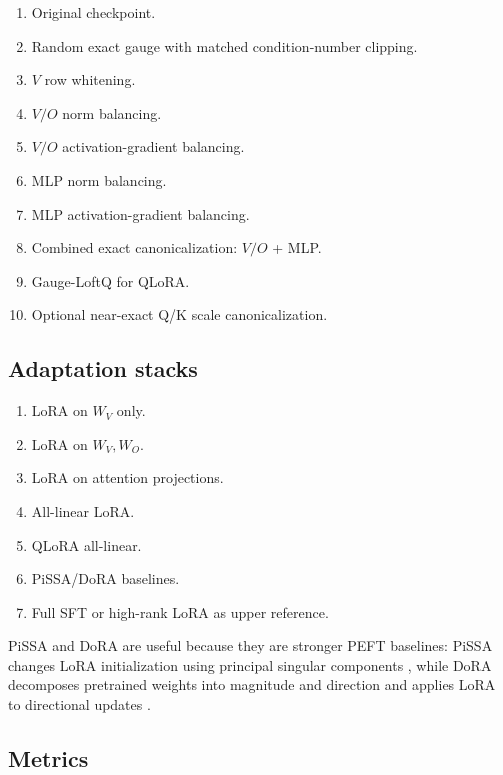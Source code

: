 \documentclass[11pt]{article}
\begin{document}
\begin{enumerate}[leftmargin=*]
    \item Original checkpoint.
    \item Random exact gauge with matched condition-number clipping.
    \item $V$ row whitening.
    \item $V/O$ norm balancing.
    \item $V/O$ activation-gradient balancing.
    \item MLP norm balancing.
    \item MLP activation-gradient balancing.
    \item Combined exact canonicalization: $V/O$ + MLP.
    \item Gauge-LoftQ for QLoRA.
    \item Optional near-exact Q/K scale canonicalization.
\end{enumerate}

\subsection{Adaptation stacks}

\begin{enumerate}[leftmargin=*]
    \item LoRA on $W_V$ only.
    \item LoRA on $W_V,W_O$.
    \item LoRA on attention projections.
    \item All-linear LoRA.
    \item QLoRA all-linear.
    \item PiSSA/DoRA baselines.
    \item Full SFT or high-rank LoRA as upper reference.
\end{enumerate}

PiSSA and DoRA are useful because they are stronger PEFT baselines: PiSSA changes LoRA initialization using principal singular components \cite{meng2024pissa}, while DoRA decomposes pretrained weights into magnitude and direction and applies LoRA to directional updates \cite{liu2024dora}.

\subsection{Metrics}
\end{document}

